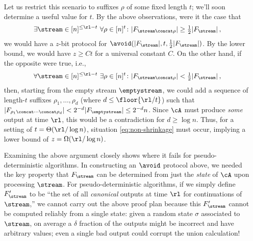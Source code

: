\begin{itemize}
\begin{itemize}
Let us restrict this scenario to suffixes $\rho$ of some fixed length $t$;
we'll soon determine a useful value for $t$. By the above observations, were
it the case that
\begin{align} \label{eq:non-shrinkage}
  \exists \stream \in [n]^{\le \rl - t}~ 
  \forall \rho \in [n]^t \colon
  |F_{\stream \concat \rho}| \ge \tfrac12 |F_\stream| \,,
\end{align}
we would have a $z$-bit protocol for $\avoid(|F_\stream|, t, \frac12
|F_\stream|)$. By the \cite{ChakrabartiGS22} lower bound, we would have $z \ge
Ct$ for a universal constant $C$.  On the other hand, if the opposite were
true, i.e.,
\begin{align} \label{eq:shrinkage}
  \forall \stream \in [n]^{\le \rl - t}~ 
  \exists \rho \in [n]^t \colon
  |F_{\stream \concat \rho}| < \tfrac12 |F_\stream| \,,
\end{align}
then, starting from the empty stream $\emptystream$, we could add a sequence
of length-$t$ suffixes $\rho_1, \ldots, \rho_d$ (where $d \le
\floor{\rl/t}$) such that $|F_{\rho_1 \concat \cdots \concat \rho_d}| < 2^{-d}
|F_\emptystream| \le 2^{-d} n$. Since $\cA$ must produce {\em some} output at
time $\rl$, this would be a contradiction for $d \ge \log n$. Thus, for a
setting of $t = \Theta(\rl/\log n)$, situation \eqref{eq:non-shrinkage} must
occur, implying a lower bound of $z = \Omega(\rl/\log n)$.

 Examining the above
argument closely shows where it fails for pseudo-deterministic algorithms. In
constructing an $\avoid$ protocol above, we needed the key property that
$F_\stream$ can be determined from just the {\em state} of $\cA$ upon
processing $\stream$.  For pseudo-deterministic algorithms, if we simply
define $F'_\stream$ to be ``the set of all \emph{canonical} outputs at time
$\rl$ for continuations of $\stream$,'' we cannot carry out the above proof
plan because this $F'_\stream$ cannot be computed reliably from a single
state: given a random state $\sigma$ associated to $\stream$, on average a
$\delta$ fraction of the outputs might be incorrect and have arbitrary values;
even a single bad output could corrupt the union calculation!


\end{itemize}
\end{itemize}
